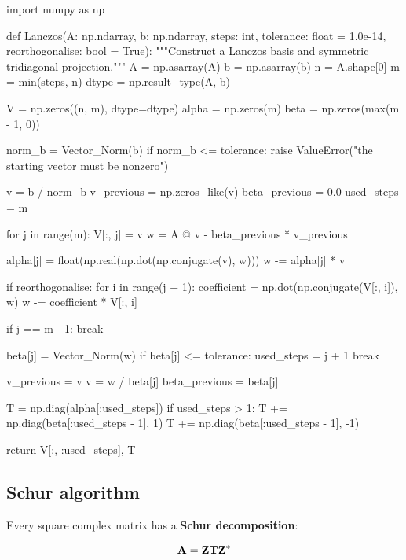 \begin{python}
import numpy as np


def Lanczos(A: np.ndarray,
            b: np.ndarray,
            steps: int,
            tolerance: float = 1.0e-14,
            reorthogonalise: bool = True):
    """Construct a Lanczos basis and symmetric tridiagonal projection."""
    A = np.asarray(A)
    b = np.asarray(b)
    n = A.shape[0]
    m = min(steps, n)
    dtype = np.result_type(A, b)

    V = np.zeros((n, m), dtype=dtype)
    alpha = np.zeros(m)
    beta = np.zeros(max(m - 1, 0))

    norm_b = Vector_Norm(b)
    if norm_b <= tolerance:
        raise ValueError("the starting vector must be nonzero")

    v = b / norm_b
    v_previous = np.zeros_like(v)
    beta_previous = 0.0
    used_steps = m

    for j in range(m):
        V[:, j] = v
        w = A @ v - beta_previous * v_previous

        alpha[j] = float(np.real(np.dot(np.conjugate(v), w)))
        w -= alpha[j] * v

        if reorthogonalise:
            for i in range(j + 1):
                coefficient = np.dot(np.conjugate(V[:, i]), w)
                w -= coefficient * V[:, i]

        if j == m - 1:
            break

        beta[j] = Vector_Norm(w)
        if beta[j] <= tolerance:
            used_steps = j + 1
            break

        v_previous = v
        v = w / beta[j]
        beta_previous = beta[j]

    T = np.diag(alpha[:used_steps])
    if used_steps > 1:
        T += np.diag(beta[:used_steps - 1], 1)
        T += np.diag(beta[:used_steps - 1], -1)

    return V[:, :used_steps], T
\end{python}

\subsection{Schur algorithm}

Every square complex matrix has a \textbf{Schur decomposition}:

\begin{equation}
    \mathbf{A}=\mathbf{Z}\mathbf{T}\mathbf{Z}^{*}
\end{equation}


